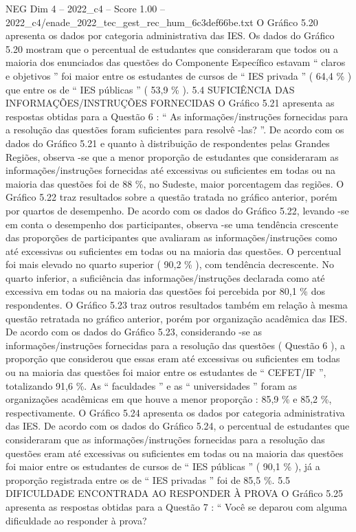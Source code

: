 \begin{textsample}{NEG Dim 4 – 2022\_c4 – Score 1.00 – 2022\_c4/enade\_2022\_tec\_gest\_rec\_hum\_6c3def66be.txt}
O Gráfico 5.20 apresenta os dados por categoria administrativa das IES.
Os dados do Gráfico 5.20 mostram que o percentual de estudantes que consideraram que todos ou a maioria dos enunciados das questões do Componente Específico estavam “ claros e objetivos ” foi maior entre os estudantes de cursos de “ IES privada ” ( 64,4 \% ) que entre os de “ IES públicas ” ( 53,9 \% ). 5.4 SUFICIÊNCIA DAS INFORMAÇÕES/INSTRUÇÕES FORNECIDAS O Gráfico 5.21 apresenta as respostas obtidas para a Questão 6 : “ As informações/instruções fornecidas para a resolução das questões foram suficientes para resolvê -las? ”.
De acordo com os dados do Gráfico 5.21 e quanto à distribuição de respondentes pelas Grandes Regiões, observa -se que a menor proporção de estudantes que consideraram as informações/instruções fornecidas até excessivas ou suficientes em todas ou na maioria das questões foi de 88 \%, no Sudeste, maior porcentagem das regiões.
O Gráfico 5.22 traz resultados sobre a questão tratada no gráfico anterior, porém por quartos de desempenho.
De acordo com os dados do Gráfico 5.22, levando -se em conta o desempenho dos participantes, observa -se uma tendência crescente das proporções de participantes que avaliaram as informações/instruções como até excessivas ou suficientes em todas ou na maioria das questões.
O percentual foi mais elevado no quarto superior ( 90,2 \% ), com tendência decrescente.
No quarto inferior, a suficiência das informações/instruções declarada como até excessiva em todas ou na maioria das questões foi percebida por 80,1 \% dos respondentes.
O Gráfico 5.23 traz outros resultados também em relação à mesma questão retratada no gráfico anterior, porém por organização acadêmica das IES.
De acordo com os dados do Gráfico 5.23, considerando -se as informações/instruções fornecidas para a resolução das questões ( Questão 6 ), a proporção que considerou que essas eram até excessivas ou suficientes em todas ou na maioria das questões foi maior entre os estudantes de “ CEFET/IF ”, totalizando 91,6 \%.
As “ faculdades ” e as “ universidades ” foram as organizações acadêmicas em que houve a menor proporção : 85,9 \% e 85,2 \%, respectivamente.
O Gráfico 5.24 apresenta os dados por categoria administrativa das IES.
De acordo com os dados do Gráfico 5.24, o percentual de estudantes que consideraram que as informações/instruções fornecidas para a resolução das questões eram até excessivas ou suficientes em todas ou na maioria das questões foi maior entre os estudantes de cursos de “ IES públicas ” ( 90,1 \% ), já a proporção registrada entre os de “ IES privadas ” foi de 85,5 \%. 5.5 DIFICULDADE ENCONTRADA AO RESPONDER À PROVA O Gráfico 5.25 apresenta as respostas obtidas para a Questão 7 : “ Você se deparou com alguma dificuldade ao responder à prova?

\end{textsample}

